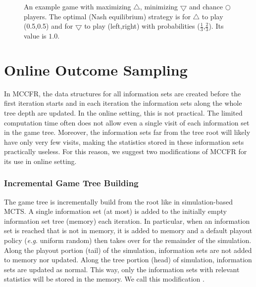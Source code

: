 \documentclass[letterpaper]{article}
\newcommand{\defword}[1]{\textbf{\boldmath{#1}}}
\newcommand{\eg}{{\it e.g.}\xspace}
\begin{document}
\begin{figure}
\begin{center}
\end{center}
\caption{An example game with maximizing $\bigtriangleup$, minimizing $\bigtriangledown$ and chance $\bigcirc$ players. The optimal (Nash equilibrium) strategy is for $\bigtriangleup$ to play (0.5,0.5) and for $\bigtriangledown$ to play (left,right) with probabilities ($\frac{1}{3}$,$\frac{2}{3}$). Its value is $1.0$.}\label{fig:coordGame}
\end{figure}


\section{Online Outcome Sampling}


In MCCFR, the data structures for all information sets are created before the first iteration starts and in each iteration the information sets along the whole tree depth are updated. In the online setting, this is not practical. The limited computation time often does not allow even a single visit of each information set in the game tree. Moreover, the information sets far from the tree root will likely have only very few visits, making the statistics stored in these information sets practically useless. For this reason, we suggest two modifications of MCCFR for its use in online setting. 

\subsubsection{Incremental Game Tree Building}
The game tree is incrementally build from the root like in simulation-based MCTS. A single information set (at most) is added to the initially empty information set tree (memory) each iteration.
In particular, when an information set is reached that is not in memory, it is added to memory and a default playout policy (\eg uniform random) then takes over for the remainder of the simulation.
Along the playout portion (tail) of the simulation, information sets are not added to memory nor updated.
Along the tree portion (head) of simulation, information sets are updated as normal. 
This way, only the information sets with relevant statistics will be stored in the memory.
We call this modification \defword{playout-based outcome sampling}.
\end{document}
